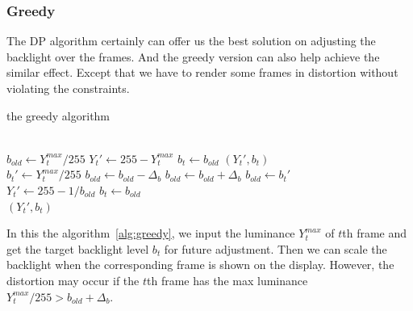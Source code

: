 \subsubsection{Greedy}
The DP algorithm certainly can offer us the best solution on adjusting
the backlight over the frames. And the greedy version can also help
achieve the similar effect. Except that we have to render some frames
in distortion without violating the constraints.

\begin{algorithm}
  \caption{the greedy algorithm}
  \label{alg:greedy}
  \begin{algorithmic}[1]
    \\
      \State $b_{old} \gets Y_{t}^{max} / 255$
      \State $Y_{t}' \gets 255 - Y_{t}^{max}$
      \State $b_{t} \gets b_{old}$
      \Return $(Y_{t}', b_t)$
    \EndIf
      \\
      \State $b_{t}' \gets Y_{t}^{max} / 255$
      \State $b_{old} \gets b_{old} - \Delta_{b}$
      \State $b_{old} \gets b_{old} + \Delta_{b}$
    \Else
      \State $b_{old} \gets b_{t}'$
    \EndIf
    \\
    \State $Y_{t}' \gets 255 - 1 / b_{old}$
    \State $b_{t} \gets b_{old}$\\
    \Return $(Y_{t}', b_{t})$
  \end{algorithmic}
  
\end{algorithm}

In this the algorithm~\ref{alg:greedy}, we input the luminance
$Y_{t}^{max}$ of $t$th frame and get the target backlight level
$b_{t}$ for future adjustment. Then we can scale the backlight when
the corresponding frame is shown on the display. However, the distortion
may occur if the $t$th frame has the max luminance $Y_t^{max}/255 >
b_{old} + \Delta_b$.




